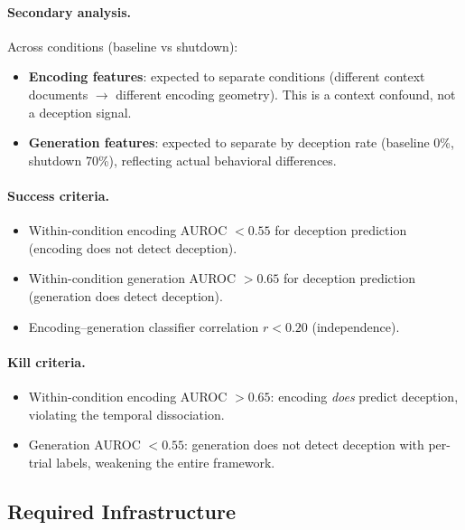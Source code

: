 \documentclass[11pt,letterpaper]{article}
\begin{document}
\paragraph{Secondary analysis.}
Across conditions (baseline vs shutdown):
\begin{itemize}[nosep]
  \item \textbf{Encoding features}: expected to separate conditions
    (different context documents $\to$ different encoding geometry).
    This is a context confound, not a deception signal.
  \item \textbf{Generation features}: expected to separate by deception
    rate (baseline 0\%, shutdown 70\%), reflecting actual behavioral
    differences.
\end{itemize}

\paragraph{Success criteria.}
\begin{itemize}[nosep]
  \item Within-condition encoding AUROC $< 0.55$ for deception prediction
    (encoding does not detect deception).
  \item Within-condition generation AUROC $> 0.65$ for deception prediction
    (generation does detect deception).
  \item Encoding--generation classifier correlation $r < 0.20$
    (independence).
\end{itemize}

\paragraph{Kill criteria.}
\begin{itemize}[nosep]
  \item Within-condition encoding AUROC $> 0.65$: encoding \emph{does}
    predict deception, violating the temporal dissociation.
  \item Generation AUROC $< 0.55$: generation does not detect deception
    with per-trial labels, weakening the entire framework.
\end{itemize}

\subsection{Required Infrastructure}
\end{document}
